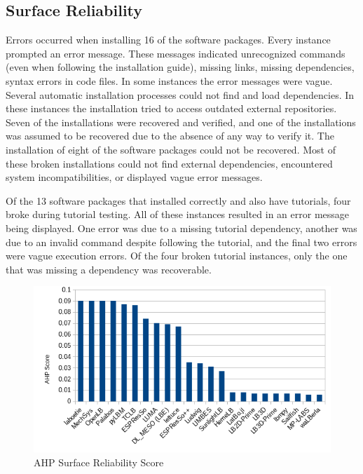 \documentclass[12pt, notitlepage]{article}
\begin{document}
\subsection{Surface Reliability}

Errors occurred when installing 16 of the software packages. Every instance prompted an error message. These messages indicated unrecognized commands (even when following the installation guide), missing links, missing dependencies, syntax errors in code files. In some instances the error messages were vague. Several automatic installation processes could not find and load dependencies. In these instances the installation tried to access outdated external repositories. Seven of the installations were recovered and verified, and one of the installations was assumed to be recovered due to the absence of any way to verify it. The installation of eight of the software packages could not be recovered. Most of these broken installations could not find external dependencies, encountered system incompatibilities, or displayed vague error messages. 

Of the 13 software packages that installed correctly and also have tutorials, four broke during tutorial testing. All of these instances resulted in an error message being displayed. One error was due to a missing tutorial dependency, another was due to an invalid command despite following the tutorial, and the final two errors were vague execution errors. Of the four broken tutorial instances, only the one that was missing a dependency was recoverable. 

\begin{figure}[h!]
	\begin{center}
		\includegraphics[width=1.0\textwidth]{reliability_chart}
		\caption{AHP Surface Reliability Score}
		\label{Fig_Reliability}
	\end{center}
\end{figure}
\end{document}
